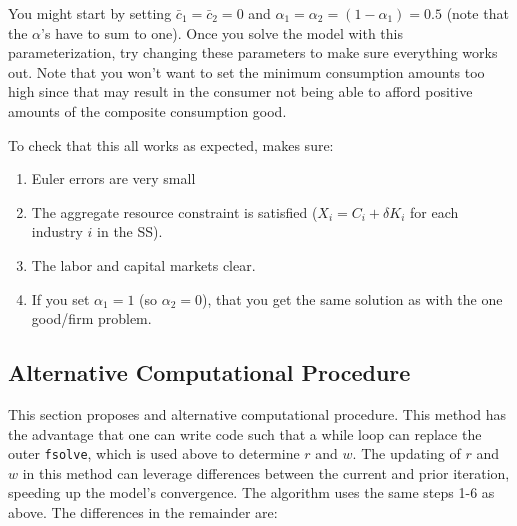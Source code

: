 \documentclass[letterpaper,12pt]{article}
\theoremstyle{definition}
\begin{document}
\begin{spacing}{1.5}
You might start by setting $\bar{c}_{1}=\bar{c}_{2}=0$ and $\alpha_{1}=\alpha_{2}=(1-\alpha_{1})=0.5$ (note that the $\alpha$'s have to sum to one).  Once you solve the model with this parameterization, try changing these parameters to make sure everything works out.  Note that you won't want to set the minimum consumption amounts too high since that may result in the consumer not being able to afford positive amounts of the composite consumption good.

To check that this all works as expected, makes sure:
\begin{enumerate}
\item Euler errors are very small
\item The aggregate resource constraint is satisfied ($X_{i}=C_{i}+\delta K_{i}$ for each industry $i$ in the SS).
\item The labor and capital markets clear.
\item If you set $\alpha_{1}=1$ (so $\alpha_{2}=0$), that you get the same solution as with the one good/firm problem.
\end{enumerate}

\subsection*{Alternative Computational Procedure}

This section proposes and alternative computational procedure.  This method has the advantage that one can write code such that a while loop can replace the outer  \texttt{fsolve}, which is used above to determine $r$ and $w$.  The updating of $r$ and $w$ in this method can leverage differences between the current and prior iteration, speeding up the model's convergence.  The algorithm uses the same steps 1-6 as above.  The differences in the remainder are:


\end{spacing}
\end{document}
